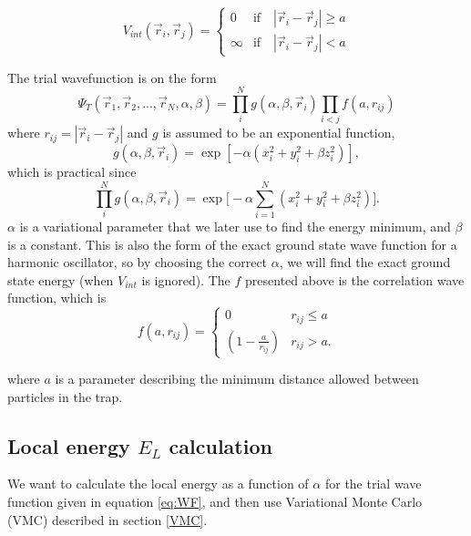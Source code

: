 \documentclass[norsk,a4paper,12pt]{article}
\begin{document}
\begin{equation}
\label{eq:V_int}
V_{int}(\vec{r}_i, \vec{r}_j)=
\begin{cases} 
0 & \text{if}\quad |\vec{r}_i-\vec{r}_j| \geq a \\
\infty & \text{if}\quad |\vec{r}_i-\vec{r}_j| < a
\end{cases}
\end{equation}

The trial wavefunction is on the form 
\begin{equation}
\Psi_T(\vec{r}_1, \vec{r}_2, ..., \vec{r}_N, \alpha, \beta)=\prod_i^Ng(\alpha, \beta, \vec{r}_i)\prod_{i<j}f(a,r_{ij})
\label{eq:WF}
\end{equation}
where $r_{ij}=|\vec{r}_i-\vec{r}_j|$ and $g$ is assumed to be an exponential function,
\begin{equation}
g(\alpha, \beta, \vec{r}_i)=\exp[-\alpha(x_i^2+y_i^2+\beta z_i^2)],
\end{equation}
which is practical since
\begin{equation}
\prod_i^Ng(\alpha, \beta, \vec{r}_i)=\exp\Big[-\alpha\sum_{i=1}^N(x_i^2+y_i^2+\beta z_i^2)\Big].
\end{equation}
$\alpha$ is a variational parameter that we later use to find the energy minimum, and $\beta$ is a constant. This is also the form of the exact ground state wave function for a harmonic oscillator, so by choosing the correct $\alpha$, we will find the exact ground state energy (when $V_{int}$ is ignored). The $f$ presented above is the correlation wave function, which is 
\begin{equation}
\label{eq:WF_interaction_part}
f(a,r_{ij})=
\begin{cases} 
   0 & r_{ij} \leq a \\
   \left(1-\frac{a}{r_{ij}}\right) & r_{ij} > a.
\end{cases}
\end{equation}

where $a$ is a parameter describing the minimum distance allowed between particles in the trap.

\subsection{Local energy $E_L$ calculation}

We want to calculate the local energy as a function of $\alpha$ for the trial wave function given in equation \ref{eq:WF}, and then use Variational Monte Carlo (VMC) described in section \ref{VMC}. 
\end{document}
